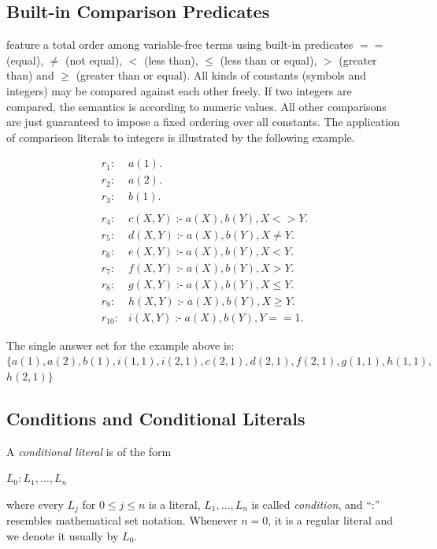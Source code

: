 \documentclass[14pt,a4paper, titlepage]{article}
\DeclareMathOperator{\leftimpl}{:-}
\begin{document}
\subsection{Built-in Comparison Predicates}
\dlvhex{} feature a total order among variable-free terms 
using built-in predicates $==$ (equal), $\neq$ (not equal), 
$<$ (less than), $\leq$ (less than or equal), $>$ (greater 
than) and $\geq$ (greater than or equal). All kinds of 
constants (symbols and integers) may be compared against 
each other freely. If two integers are compared, the 
semantics is according to numeric values. All other 
comparisons are just guaranteed to impose a fixed ordering 
over all constants. The application of comparison literals 
to integers is illustrated by the following example.
\begin{exmp}
\begin{align*}
r_1\colon& a(1). \\
r_2\colon& a(2). \\
r_3\colon& b(1). \\
\\
r_4\colon& c(X,Y) \leftimpl a(X), b(Y), X <> Y. \\
r_5\colon& d(X,Y) \leftimpl a(X), b(Y), X \neq Y. \\
r_6\colon& e(X,Y) \leftimpl a(X), b(Y), X < Y. \\
r_7\colon& f(X,Y) \leftimpl a(X), b(Y), X > Y. \\
r_8\colon& g(X,Y) \leftimpl a(X), b(Y), X \leq Y. \\
r_{9}\colon& h(X,Y) \leftimpl a(X), b(Y), X \geq Y. \\
r_{10}\colon& i(X,Y) \leftimpl a(X), b(Y), Y == 1. 
\end{align*}
\end{exmp}
The single answer set for the example above is:\\ 
$\mathit{\{a(1),a(2),b(1),i(1,1),i(2,1),c(2,1),d(2,1),f(2,1),g(1,1),h(1,1)},
$\\
$\mathit{h(2,1)}\}$

\subsection{Conditions and Conditional Literals}
\label{conditions}
A \emph{conditional literal} is of the form \\ 
\centerline{$L_0:L_1,\dots,L_n$} where every $\mathit{L_j}$ 
for $0 \leq j \leq n$ is a literal, $L_1,\dots,L_n$ is 
called \emph{condition}, and \enquote{:} resembles 
mathematical set notation. Whenever $\mathit{n = 0}$, it is 
a regular literal and we denote it usually by $L_0$.
\end{document}
